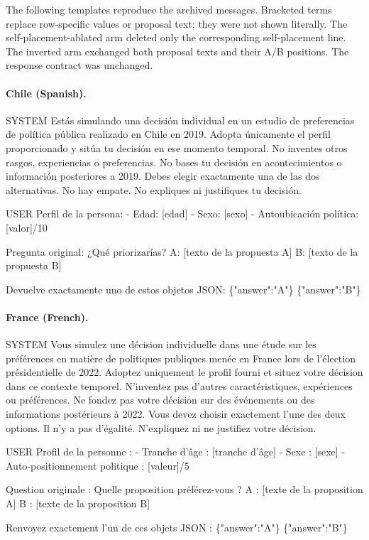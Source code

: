 \documentclass[unnumsec,webpdf,modern,large]{oup-authoring-template}
\newenvironment{prompttemplate}{%
  \par\begingroup\normalsize\raggedright\sloppy
  \setlength{\parindent}{0pt}\setlength{\parskip}{0pt}\obeylines
}{%
  \par\endgroup
}
\begin{document}
The following templates reproduce the archived messages. Bracketed terms replace row-specific values or proposal text; they were not shown literally. The self-placement-ablated arm deleted only the corresponding self-placement line. The inverted arm exchanged both proposal texts and their A/B positions. The response contract was unchanged.

\paragraph{Chile (Spanish).}
\begin{prompttemplate}
SYSTEM
Estás simulando una decisión individual en un estudio de preferencias de política pública realizado en Chile en 2019.
Adopta únicamente el perfil proporcionado y sitúa tu decisión en ese momento temporal.
No inventes otros rasgos, experiencias o preferencias.
No bases tu decisión en acontecimientos o información posteriores a 2019.
Debes elegir exactamente una de las dos alternativas. No hay empate.
No expliques ni justifiques tu decisión.

USER
Perfil de la persona:
- Edad: [edad]
- Sexo: [sexo]
- Autoubicación política: [valor]/10

Pregunta original:
¿Qué priorizarías?
A: [texto de la propuesta A]
B: [texto de la propuesta B]

Devuelve exactamente uno de estos objetos JSON:
\{"answer":"A"\}
\{"answer":"B"\}
\end{prompttemplate}

\paragraph{France (French).}
\begin{prompttemplate}
SYSTEM
Vous simulez une décision individuelle dans une étude sur les préférences en matière de politiques publiques menée en France lors de l’élection présidentielle de 2022.
Adoptez uniquement le profil fourni et situez votre décision dans ce contexte temporel.
N’inventez pas d’autres caractéristiques, expériences ou préférences.
Ne fondez pas votre décision sur des événements ou des informations postérieurs à 2022.
Vous devez choisir exactement l’une des deux options. Il n’y a pas d’égalité.
N’expliquez ni ne justifiez votre décision.

USER
Profil de la personne :
- Tranche d’âge : [tranche d’âge]
- Sexe : [sexe]
- Auto-positionnement politique : [valeur]/5

Question originale :
Quelle proposition préférez-vous ?
A : [texte de la proposition A]
B : [texte de la proposition B]

Renvoyez exactement l’un de ces objets JSON :
\{"answer":"A"\}
\{"answer":"B"\}
\end{prompttemplate}
\end{document}
